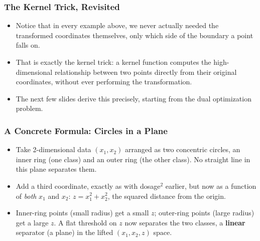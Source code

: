\begin{frame}[fragile] \frametitle{The Kernel Trick, Revisited}
\begin{itemize}
\item Notice that in every example above, we never actually needed the transformed coordinates themselves, only which side of the boundary a point falls on.
\item That is exactly the kernel trick: a kernel function computes the high-dimensional relationship between two points directly from their original coordinates, without ever performing the transformation.
\item The next few slides derive this precisely, starting from the dual optimization problem.
\end{itemize}
\end{frame}

\begin{frame}[fragile] \frametitle{A Concrete Formula: Circles in a Plane}
\begin{itemize}
\item Take 2-dimensional data $(x_1,x_2)$ arranged as two concentric circles, an inner ring (one class) and an outer ring (the other class). No straight line in this plane separates them.
\end{itemize}
\begin{center}
\end{center}
\begin{itemize}
\item Add a third coordinate, exactly as with dosage$^2$ earlier, but now as a function of \emph{both} $x_1$ and $x_2$: $z = x_1^2+x_2^2$, the squared distance from the origin.
\item Inner-ring points (small radius) get a small $z$; outer-ring points (large radius) get a large $z$. A flat threshold on $z$ now separates the two classes, a \textbf{linear} separator (a plane) in the lifted $(x_1,x_2,z)$ space.
\end{itemize}
\end{frame}

